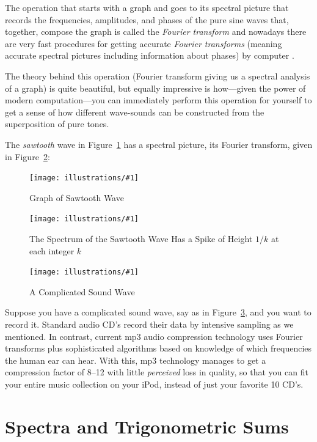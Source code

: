 \documentclass[openany]{book}
\newcommand{\ill}[3]{%
   \begin{figure}[H]%
   \vspace{-2ex}
   \centering%
   \texttt{[image: illustrations/\#1]}%
   \caption{#3}%
   \vspace{-2ex}
    \end{figure}}
\theoremstyle{plain}
\theoremstyle{definition}
\begin{document}
 
The operation that starts with a graph and goes to its spectral
picture that records the frequencies, amplitudes, and phases of the
pure sine waves that, together, compose the graph is called the {\em
  Fourier transform} and nowadays there are very fast procedures for
getting accurate {\em Fourier transforms} (meaning accurate spectral
pictures including information about phases) by
computer .
 
 
The theory behind this operation (Fourier transform giving
us a spectral analysis of a graph) is quite beautiful, but equally
impressive is how---given the power of modern computation---you can
immediately perform this operation for yourself to get a sense of how
different wave-sounds can be constructed from the superposition of
pure tones.  

The {\em sawtooth} wave in Figure~\ref{fig:sawtooth} has a spectral picture, its Fourier transform, given in Figure~\ref{fig:sawtooth-spectrum}:
   
   \ill{sawtooth}{.7}{Graph of Sawtooth Wave\label{fig:sawtooth}}
   \ill{sawtooth-spectrum}{.6}{The Spectrum of the Sawtooth Wave Has a Spike of Height $1/k$ at 
each integer $k$\label{fig:sawtooth-spectrum}}


 
 \ill{complicated-wave}{.6}{A Complicated Sound Wave\label{fig:complicated-wave}}
 
Suppose you have a complicated sound wave, say as in
Figure~\ref{fig:complicated-wave}, and you want to record it.
Standard audio CD's record their data by intensive sampling as we
mentioned. In contrast, current mp3 audio compression technology uses
Fourier transforms plus sophisticated algorithms based on
knowledge of which frequencies the human ear can hear. 
With this, mp3 technology manages to
get a compression factor of 8--12 with little {\em perceived} loss in
quality, so that you can fit your entire music collection on your
iPod, instead of just your favorite 10 CD's.  
 
 
 \chapter{Spectra and Trigonometric Sums \label{sec:trigsums}}
\end{document}
